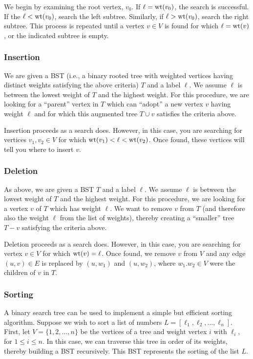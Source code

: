We begin by examining the root vertex, $v_0$. If $\ell={\rm wt}(v_0)$,
the search is successful. If the $\ell<{\rm wt}(v_0)$,
search the left subtree. Similarly, if $\ell>{\rm wt}(v_0)$,
search the right subtree. This process is repeated until a vertex
$v\in V$ is found for which $\ell={\rm wt}(v)$,
or the indicated subtree is empty.


\subsubsection{Insertion}

We are given a BST (i.e., a binary rooted tree with weighted vertices
having distinct weights satisfying the above criteria) $T$ and a
label $\ell$. We assume $\ell$ is between the
lowest weight of $T$ and the highest weight.
For this procedure, we are looking for a ``parent''
vertex in $T$ which can ``adopt'' a new vertex $v$ having weight $\ell$
and for which this augmented tree $T\cup v$ satisfies
the criteria above.

Insertion proceeds as a search does. However, in this case, you are
searching for vertices $v_1,v_2\in V$ for which
${\rm wt}(v_1)<\ell < {\rm wt}(v_2)$. Once found, these
vertices will tell you where to insert $v$.

\subsubsection{Deletion}

As above, we are given a BST $T$ and a
label $\ell$. We assume $\ell$ is between the
lowest weight of $T$ and the highest weight.
For this procedure, we are looking for a vertex $v$ of
$T$ which has weight $\ell$. We want to remove $v$ from
$T$ (and therefore also the weight $\ell$ from the list of weights),
thereby creating a ``smaller'' tree $T- v$ satisfying
the criteria above.

Deletion proceeds as a search does. However, in this case, you are
searching for vertex $v\in V$ for which
${\rm wt}(v)=\ell$. Once found, we remove $v$ from $V$
and any edge $(u,v)\in E$ is replaced by $(u,w_1)$
and $(u,w_2)$, where $w_1.w_2\in V$ were the children of $v$
in $T$.

\subsubsection{Sorting}

A binary search tree can be used to implement a simple but efficient
sorting algorithm. Suppose we wish to sort a list of numbers
$L = [\ell_1, \ell_2,\dots, \ell_n]$. First, let $V=\{1,2,\dots,n\}$
be the vertices of a tree and weight vertex $i$ with $\ell_i$,
for $1\leq i\leq n$. In this case, we can traverse this tree
in order of its weights, thereby building a BST recursively.
This BST represents the sorting of the list $L$.
